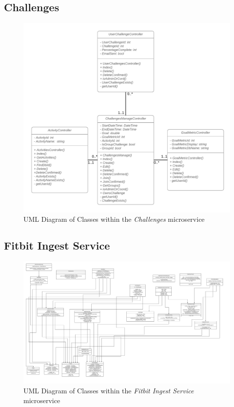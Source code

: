\begin{landscape}
\subsection{Challenges}
\begin{figure}[H]
    \centering
    \includegraphics[width=\textwidth]{Images/class_uml/challenges.png}
    \caption{UML Diagram of Classes within the \textit{Challenges} microservice}
    \label{fig:class_uml:challenges}
\end{figure}

\subsection{Fitbit Ingest Service}
\begin{figure}[H]
    \centering
    \includegraphics[width=\textwidth]{Images/class_uml/fitbit-ingest-service.png}
    \caption{UML Diagram of Classes within the \textit{Fitbit Ingest Service} microservice}
    \label{fig:class_uml:fitbit-ingest-service}
\end{figure}


\end{landscape}
